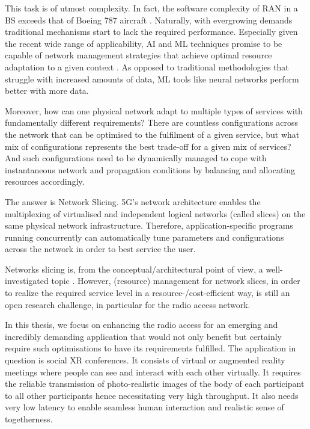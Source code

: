 This task is of utmost complexity. In fact, the software complexity of \ac{RAN} in a \ac{BS} exceeds that of Boeing 787 aircraft \cite{5facts_ericsson}. Naturally, with evergrowing demands traditional mechanisms start to lack the required performance. Especially given the recent wide range of applicability, \ac{AI} and \ac{ML} techniques promise to be capable of network management strategies that achieve optimal resource adaptation to a given context \cite{7792374}. As opposed to traditional methodologies that struggle with increased amounts of data, \ac{ML} tools like neural networks perform better with more data.

Moreover, how can one physical network adapt to multiple types of services with fundamentally different requirements?
There are countless configurations across the network that can be optimised to the fulfilment of a given service, but what mix of configurations represents the best trade-off for a given mix of services? And such configurations need to be dynamically managed to cope with instantaneous network and propagation conditions by balancing and allocating resources accordingly. 

\vspace{0.5cm}

The answer is Network Slicing. \ac{5G}'s network architecture enables the multiplexing of virtualised and independent logical networks (called slices) on the same physical network infrastructure. Therefore, application-specific programs running concurrently can automatically tune parameters and configurations across the network in order to best service the user.

\vspace{0.5cm}

Networks slicing is, from the conceptual/architectural point of view, a well-investigated topic \cite{slicing_survey}. However, (resource) management for network slices, in order to realize the required service level in a resource-/cost-efficient way, is still an open research challenge, in particular for the radio access network.

\vspace{0.5cm}

In this thesis, we focus on enhancing the radio access for an emerging and incredibly demanding application that would not only benefit but certainly require such optimisations to have its requirements fulfilled. The application in question is social \ac{XR} conferences. It consists of virtual or augmented reality meetings where people can see and interact with each other virtually. It requires the reliable transmission of photo-realistic images of the body of each participant to all other participants hence necessitating very high throughput. It also needs very low latency to enable seamless human interaction and realistic sense of togetherness.

